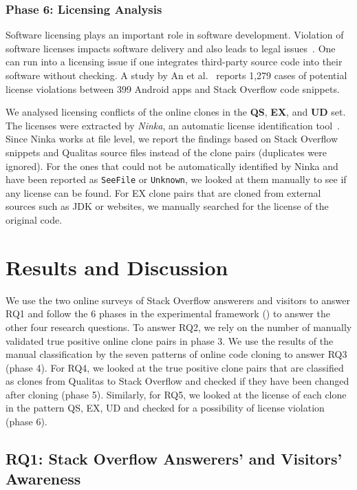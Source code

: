 \documentclass[10pt,journal,compsoc]{IEEEtran}
\begin{document}
\subsubsection{Phase 6: Licensing Analysis} Software licensing plays an important
role in software development. Violation of software licenses impacts software
delivery and also leads to legal issues~\cite{Sprigman2015}. 
One can run into a licensing issue if one integrates third-party source code
into their software without checking. A study by An et al.~\cite{An2017} reports
1,279 cases of potential license violations between 399 Android apps and Stack
Overflow code snippets.

We analysed licensing conflicts of the online clones in the \textbf{QS},
\textbf{EX}, and \textbf{UD} set. The licenses were extracted by \emph{Ninka},
an automatic license identification tool~\cite{German2010}. Since Ninka works at
file level, we report the findings based on Stack Overflow snippets and Qualitas
source files instead of the clone pairs (duplicates were ignored). For the ones
that could not be automatically identified by Ninka and have been reported as
{\small\texttt{SeeFile}} or {\small\texttt{Unknown}}, we looked at them manually
to see if any license can be found. For EX clone pairs that are cloned from
external sources such as JDK or websites, we manually searched for the license
of the original code.

\section{Results and Discussion}

We use the two online surveys of Stack Overflow answerers and visitors to answer RQ1
and follow the 6 phases in the experimental framework
() to answer the other four research questions. To answer RQ2,
we rely on the number of manually validated true positive online clone pairs in
phase 3. We use the results of the manual classification by the seven patterns
of online code cloning to answer RQ3 (phase 4). For RQ4, we looked at the true
positive clone pairs that are classified as clones from Qualitas to Stack
Overflow and checked if they have been changed after cloning (phase 5).
Similarly, for RQ5, we looked at the license of each clone in the pattern QS,
EX, UD and checked for a possibility of license violation (phase 6). 

\subsection{RQ1: Stack Overflow Answerers' and Visitors' Awareness}
\end{document}
